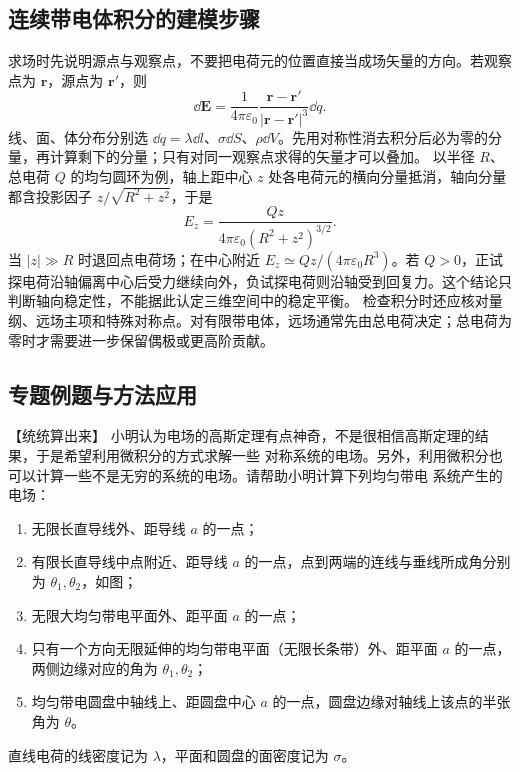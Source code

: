 \subsection{连续带电体积分的建模步骤}
求场时先说明源点与观察点，不要把电荷元的位置直接当成场矢量的方向。若观察点为 $\boldsymbol r$，源点为 $\boldsymbol r'$，则
\[
 \dd\boldsymbol E=\frac{1}{4\pi\varepsilon_0}
 \frac{\boldsymbol r-\boldsymbol r'}{|\boldsymbol r-\boldsymbol r'|^3}\dd q.
\]
线、面、体分布分别选 $\dd q=\lambda\dd l$、$\sigma\dd S$、$\rho\dd V$。先用对称性消去积分后必为零的分量，再计算剩下的分量；只有对同一观察点求得的矢量才可以叠加。
以半径 $R$、总电荷 $Q$ 的均匀圆环为例，轴上距中心 $z$ 处各电荷元的横向分量抵消，轴向分量都含投影因子 $z/\sqrt{R^2+z^2}$，于是
\[
 E_z=\frac{Qz}{4\pi\varepsilon_0(R^2+z^2)^{3/2}}.
\]
当 $|z|\gg R$ 时退回点电荷场；在中心附近 $E_z\simeq Qz/(4\pi\varepsilon_0R^3)$。若 $Q>0$，正试探电荷沿轴偏离中心后受力继续向外，负试探电荷则沿轴受到回复力。这个结论只判断轴向稳定性，不能据此认定三维空间中的稳定平衡。
检查积分时还应核对量纲、远场主项和特殊对称点。对有限带电体，远场通常先由总电荷决定；总电荷为零时才需要进一步保留偶极或更高阶贡献。


\subsection{专题例题与方法应用}

\begin{origexamplebox}{【统统算出来】}\label{ch19:ex:s32-1-1}
小明认为电场的高斯定理有点神奇，不是很相信高斯定理的结果，于是希望利用微积分的方式求解一些
对称系统的电场。另外，利用微积分也可以计算一些不是无穷的系统的电场。请帮助小明计算下列均匀带电
系统产生的电场：
\begin{enumerate}[label=\arabic*.]
  \item 无限长直导线外、距导线 $a$ 的一点；
  \item 有限长直导线中点附近、距导线 $a$ 的一点，点到两端的连线与垂线所成角分别为
  $\theta_1,\theta_2$，如图；
  \item 无限大均匀带电平面外、距平面 $a$ 的一点；
  \item 只有一个方向无限延伸的均匀带电平面（无限长条带）外、距平面 $a$ 的一点，两侧边缘对应的角为
  $\theta_1,\theta_2$；
  \item 均匀带电圆盘中轴线上、距圆盘中心 $a$ 的一点，圆盘边缘对轴线上该点的半张角为 $\theta$。
\end{enumerate}
直线电荷的线密度记为 $\lambda$，平面和圆盘的面密度记为 $\sigma$。
\par\noindent\begin{minipage}{\linewidth}
\emFiniteLineQuestion
{}\label{ch19:fig:em-question-1}
\end{minipage}\par\medskip

\ThQElectroSystems
\end{origexamplebox}\par\nopagebreak[4]

